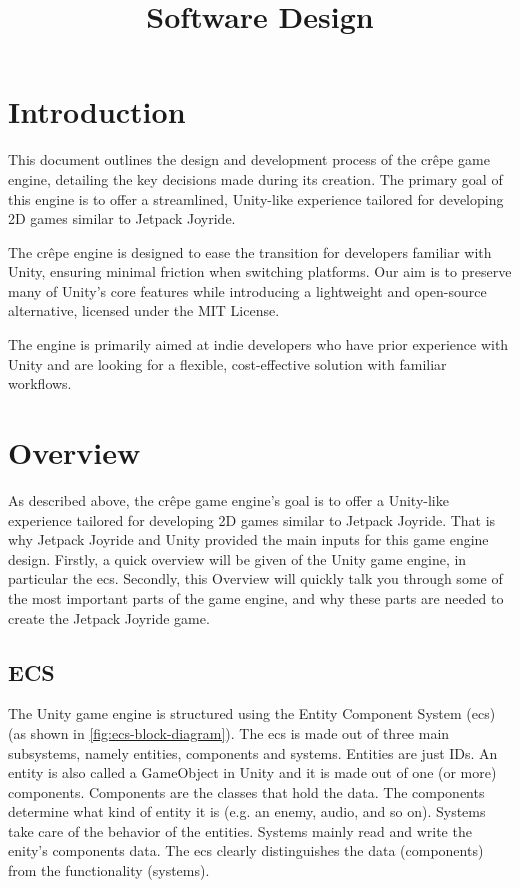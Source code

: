 \documentclass{projdoc}
\title{Software Design}
\begin{document}
\tablestables
\newpage

\section{Introduction}

This document outlines the design and development process of the cr\^epe game engine,
detailing the key decisions made during its creation. The primary goal of this engine
is to offer a streamlined, Unity-like experience tailored for developing 2D games
similar to Jetpack Joyride.

The cr\^epe engine is designed to ease the transition for developers familiar with
Unity, ensuring minimal friction when switching platforms. Our aim is to preserve
many of Unity's core features while introducing a lightweight and open-source
alternative, licensed under the MIT License.

The engine is primarily aimed at indie developers who have prior experience with
Unity and are looking for a flexible, cost-effective solution with familiar
workflows.

\section{Overview}

As described above, the cr\^epe game engine's goal is to offer a Unity-like
experience tailored for developing 2D games similar to Jetpack Joyride. That is why
Jetpack Joyride and Unity provided the main inputs for this game engine design.
Firstly, a quick overview will be given of the Unity game engine, in particular the
\gls{ecs}. Secondly, this Overview will quickly talk you through some of the most
important parts of the game engine, and why these parts are needed to create the
Jetpack Joyride game.

\subsection{ECS}

The Unity game engine is structured using the Entity Component System (\gls{ecs}) (as
shown in \cref{fig:ecs-block-diagram}). The \gls{ecs} is made out of three main
subsystems, namely entities, components and systems. Entities are just IDs. An entity
is also called a GameObject in Unity and it is made out of one (or more) components.
Components are the classes that hold the data. The components determine what kind of
entity it is (e.g. an enemy, audio, and so on). Systems take care of the behavior of
the entities. Systems mainly read and write the enity's components data. The
\gls{ecs} clearly distinguishes the data (components) from the functionality
(systems).
\end{document}
